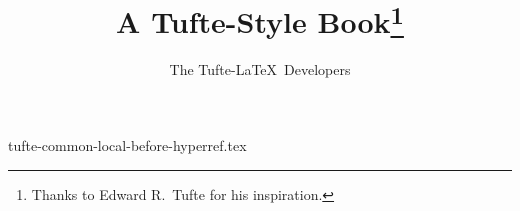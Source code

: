 

\begin{filecontents}{tufte-common-local-before-hyperref.tex}
\usepackage{amsmath}
\usepackage{graphicx} %
  \graphicspath{{graphics/}} %
\usepackage{booktabs} %
\usepackage{multicol} %
\usepackage{lipsum}   %
\usepackage{fancyvrb} %
\usepackage{minted-code}
\usepackage{xspace}
\usepackage{siunitx}

\usepackage{makeidx}\makeindex
\end{filecontents}


\documentclass[
  sidenote=raggedright,
  marginnote=raggedright,
  caption=raggedright,
  marginals=raggedright,
  origFonts,
  natbib=false,
  hyperref]{xtufte-book}

\hypersetup{colorlinks}%




\usepackage{lipsum}
\title{A Tufte-Style Book\thanks{Thanks to Edward R.~Tufte for his inspiration.}}
\author[The Tufte-LaTeX Developers]{The Tufte-LaTeX\ Developers}

\newcommand\hangp[1]{\makebox[0pt][r]{(}#1\makebox[0pt][l]{)}}

\newcommand\hangstar{\makebox[0pt][l]{*}}

%

\newcommand\xPack[1]{\texttt{#1}\index{#1 (package)}}
\newcommand{\vdqi}{\textit{VDQI}\xspace}
\newcommand{\ei}{\textit{EI}\xspace}
\newcommand{\ve}{\textit{VE}\xspace}
\newcommand{\be}{\textit{BE}\xspace}
\newcommand{\VDQI}{\textit{The Visual Display of Quantitative Information}\xspace}
\newcommand{\EI}{\textit{Envisioning Information}\xspace}
\newcommand{\VE}{\textit{Visual Explanations}\xspace}
\newcommand{\BE}{\textit{Beautiful Evidence}\xspace}

